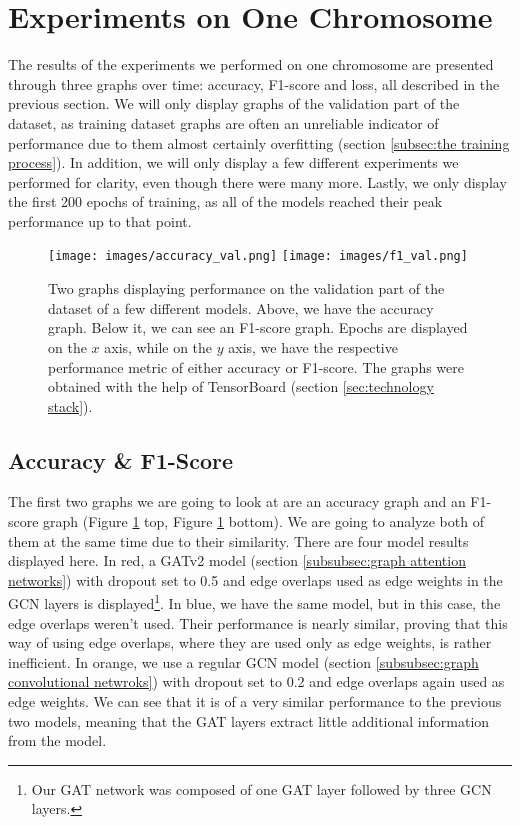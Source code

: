 \documentclass[times, utf8, diplomski, english]{fer_eng}
\begin{document}
\section{Experiments on One Chromosome}
\label{sec:experiments on one chromosome}

The results of the experiments we performed on one chromosome are presented through three graphs over time: accuracy, F1-score and loss, all described in the previous section. We will only display graphs of the validation part of the dataset, as training dataset graphs are often an unreliable indicator of performance due to them almost certainly overfitting (section \ref{subsec:the training process}). In addition, we will only display a few different experiments we performed for clarity, even though there were many more. Lastly, we only display the first 200 epochs of training, as all of the models reached their peak performance up to that point.

\begin{figure}[h]
	\centering
	\texttt{[image: images/accuracy\_val.png]}
	\texttt{[image: images/f1\_val.png]}
	\caption[Accuracy and f1 graph]{Two graphs displaying performance on the validation part of the dataset of a few different models. Above, we have the accuracy graph. Below it, we can see an F1-score graph. Epochs are displayed on the $x$ axis, while on the $y$ axis, we have the respective performance metric of either accuracy or F1-score. The graphs were obtained with the help of TensorBoard (section \ref{sec:technology stack}).}
	\label{fig:accuracy and f1 graph}
\end{figure}

\subsection{Accuracy \& F1-Score}

The first two graphs we are going to look at are an accuracy graph and an F1-score graph (Figure \ref{fig:accuracy and f1 graph} top, Figure \ref{fig:accuracy and f1 graph} bottom). We are going to analyze both of them at the same time due to their similarity. There are four model results displayed here. In red, a GATv2 model (section \ref{subsubsec:graph attention networks}) with dropout set to 0.5 and edge overlaps used as edge weights in the GCN layers is displayed\footnote{Our GAT network was composed of one GAT layer followed by three GCN layers.}. In blue, we have the same model, but in this case, the edge overlaps weren't used. Their performance is nearly similar, proving that this way of using edge overlaps, where they are used only as edge weights, is rather inefficient. In orange, we use a regular GCN model (section \ref{subsubsec:graph convolutional netwroks}) with dropout set to 0.2 and edge overlaps again used as edge weights. We can see that it is of a very similar performance to the previous two models, meaning that the GAT layers extract little additional information from the model.
\end{document}
